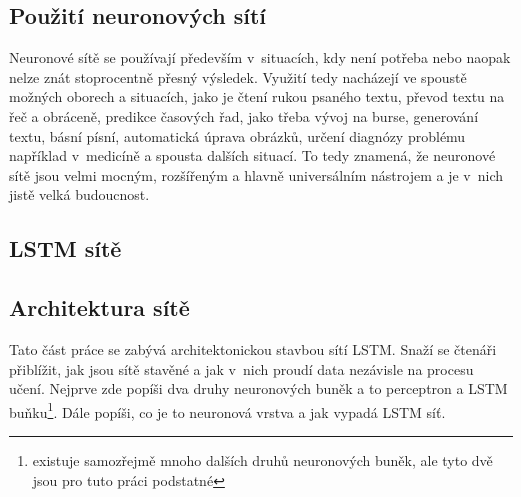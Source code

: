 \documentclass[a4paper]{article}
\begin{document}
\subsection{Použití neuronových sítí}
Neuronové sítě se používají především v~situacích, kdy není potřeba nebo naopak nelze znát stoprocentně přesný výsledek. Využití tedy nacházejí ve spoustě možných oborech a situacích, jako je čtení rukou psaného textu, převod textu na řeč a obráceně, predikce časových řad, jako třeba vývoj na burse, generování textu, básní písní, automatická úprava obrázků, určení diagnózy problému například v~medicíně a spousta dalších situací. To tedy znamená, že neuronové sítě jsou velmi mocným, rozšířeným a hlavně universálním nástrojem a je v~nich jistě velká budoucnost.
\begin{center}
\clearpage
\section{LSTM sítě}
\end{center}
\subsection{Architektura sítě}
 Tato část práce se zabývá architektonickou stavbou sítí LSTM. Snaží se čtenáři přiblížit, jak jsou sítě stavěné a jak v~nich proudí data nezávisle na procesu učení. Nejprve zde popíši dva druhy neuronových buněk a to perceptron a LSTM buňku\footnote{existuje samozřejmě mnoho dalších druhů neuronových buněk, ale tyto dvě jsou pro tuto práci podstatné}. Dále popíši, co je to neuronová vrstva a jak vypadá LSTM síť.
\end{document}
